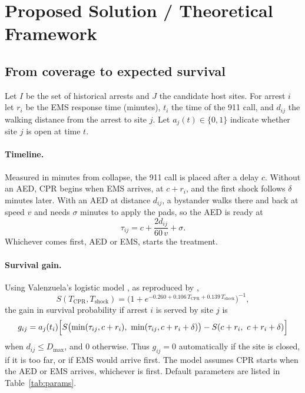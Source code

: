 \documentclass[11pt]{article}
\begin{document}
\section{Proposed Solution / Theoretical Framework}

\subsection{From coverage to expected survival}
Let $I$ be the set of historical arrests and $J$ the candidate host sites. For arrest $i$ let $r_i$ be the EMS response time (minutes), $t_i$ the time of the 911 call, and $d_{ij}$ the walking distance from the arrest to site $j$. Let $a_j(t)\in\{0,1\}$ indicate whether site $j$ is open at time $t$.

\paragraph{Timeline.} Measured in minutes from collapse, the 911 call is placed after a delay $c$. Without an AED, CPR begins when EMS arrives, at $c+r_i$, and the first shock follows $\delta$ minutes later. With an AED at distance $d_{ij}$, a bystander walks there and back at speed $v$ and needs $\sigma$ minutes to apply the pads, so the AED is ready at
\[
\tau_{ij} = c + \frac{2d_{ij}}{60\,v} + \sigma .
\]
Whichever comes first, AED or EMS, starts the treatment.

\paragraph{Survival gain.} Using Valenzuela's logistic model \cite{valenzuela1997}, as reproduced by \cite{erkut2008},
\[
S(T_{\mathrm{CPR}},T_{\mathrm{shock}}) = \bigl(1+e^{-0.260+0.106\,T_{\mathrm{CPR}}+0.139\,T_{\mathrm{shock}}}\bigr)^{-1},
\]
the gain in survival probability if arrest $i$ is served by site $j$ is
\[
g_{ij} = a_j(t_i)\Bigl[S\bigl(\min(\tau_{ij},c+r_i),\ \min(\tau_{ij},c+r_i+\delta)\bigr) - S(c+r_i,\ c+r_i+\delta)\Bigr]
\]
when $d_{ij}\le D_{\max}$, and $0$ otherwise. Thus $g_{ij}=0$ automatically if the site is closed, if it is too far, or if EMS would arrive first. The model assumes CPR starts when the AED or EMS arrives, whichever is first. Default parameters are listed in Table~\ref{tab:params}.
\end{document}
